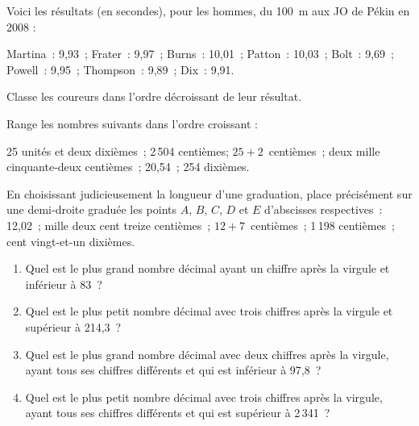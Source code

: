 \begin{exercice}
Voici les résultats (en secondes), pour les hommes, du 100 m aux JO de Pékin en 2008 : \vspace{0.75em}

Martina : 9,93 ; Frater : 9,97 ; Burns : 10,01 ; Patton : 10,03 ; Bolt : 9,69 ; Powell : 9,95 ; Thompson : 9,89 ; Dix : 9,91.\vspace{0.75em}

Classe les coureurs dans l'ordre décroissant de leur résultat.
\end{exercice}


\begin{exercice}[À ordonner]
Range les nombres suivants dans l'ordre croissant : \vspace{0.75em}

25 unités et deux dixièmes ; 2\,504 centièmes; $25 + 2$ centièmes ; deux mille cinquante‑deux centièmes ; 20,54 ; 254 dixièmes.
\end{exercice}


\begin{exercice}[À placer]
En choisissant judicieusement la longueur d'une graduation, place précisément sur une demi‑droite graduée les points $A$, $B$, $C$, $D$ et $E$ d'abscisses respectives : \\[0.75em]
12,02 ; mille deux cent treize centièmes ; $12 + 7$ centièmes ; 1\,198 centièmes ; cent vingt-et-un dixièmes.
\end{exercice}


\begin{exercice}[Comparaison]
\begin{enumerate}
 \item Quel est le plus grand nombre décimal ayant un chiffre après la virgule et inférieur à 83 ?
 \item Quel est le plus petit nombre décimal avec trois chiffres après la virgule et supérieur à 214,3 ?
 \item Quel est le plus grand nombre décimal avec deux chiffres après la virgule, ayant tous ses chiffres différents et qui est inférieur à 97,8 ?
 \item Quel est le plus petit nombre décimal avec trois chiffres après la virgule, ayant tous ses chiffres différents et qui est supérieur à 2\,341 ?
 \end{enumerate}
\end{exercice}


